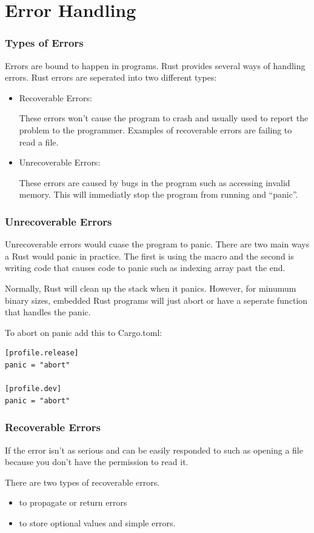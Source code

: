 \documentclass{beamer}
\begin{document}
\section{Error Handling}
\begin{frame}
  \frametitle{Types of Errors}
  Errors are bound to happen in programs. Rust provides several ways of handling errors. Rust errors are seperated into two different types:
  \begin{itemize}
    \item{Recoverable Errors:

          These errors won't cause the program to crash and usually used to report the problem to the programmer. Examples of recoverable errors are failing to read a file.}
    \item{Unrecoverable Errors:

          These errors are caused by bugs in the program such as accessing invalid memory. This will immediatly stop the program from running and ``panic''.}
  \end{itemize}
\end{frame}

\begin{frame}
  \frametitle{Unrecoverable Errors}
  Unrecoverable errors would cuase the program to panic. There are two main ways a Rust would panic in practice. The first is using the  macro and the second is writing code that causes code to panic such as indexing array past the end.
  
  Normally, Rust will clean up the stack when it panics. However, for minumum binary sizes, embedded Rust programs will just abort or have a seperate function that handles the panic.

  \pagebreak

  To abort on panic add this to Cargo.toml:

\begin{lstlisting}
[profile.release]
panic = "abort"

[profile.dev]
panic = "abort"
\end{lstlisting}
\end{frame}

\begin{frame}
  \frametitle{Recoverable Errors}
  If the error isn't as serious and can be easily responded to such as opening a file because you don't have the permission to read it.

  There are two types of recoverable errors.
  \begin{itemize}
    \item{ to propagate or return errors}
    \item{ to store optional values and simple errors.}
  \end{itemize}
\end{frame}
\end{document}
